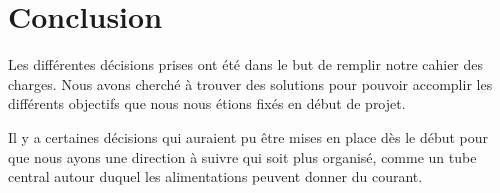 \documentclass[
	a4paper,									%
	11pt,										%
	twoside,									%
	openright,									%
	notitlepage,									%
	parskip=half,								%
]{scrreprt}										%
\begin{document}
\chapter{Conclusion}

Les différentes décisions prises ont été dans le but de remplir notre cahier des charges. 
Nous avons cherché à trouver des solutions pour pouvoir accomplir les différents objectifs que 
nous nous étions fixés en début de projet. \par

Il y a certaines décisions qui auraient pu être mises en place dès le début pour que nous ayons une
direction à suivre qui soit plus organisé, comme un tube central autour duquel les alimentations 
peuvent donner du courant. \par
\end{document}
